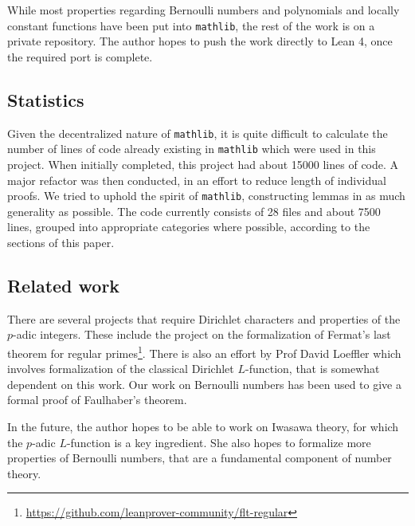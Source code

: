 \documentclass[a4paper,UKenglish,cleveref, autoref, thm-restate,pdfa]{lipics-v2021}
\newcommand{\lean}[1]{\texttt{#1}\xspace} %
\begin{document}
While most properties regarding Bernoulli numbers and polynomials and locally constant functions have been put into \lean{mathlib}, the rest of the work is on a private repository. The author hopes to push the 
work directly to Lean 4, once the required port is complete.

\subsection{Statistics}
Given the decentralized nature of \lean{mathlib}, it is quite difficult to calculate the number of lines of code 
already existing in \lean{mathlib} which were used in this project. When initially completed, this project had about 
15000 lines of code. A major refactor was then conducted, in an effort to reduce length of individual proofs. 
We tried to uphold the spirit of \lean{mathlib}, constructing lemmas in as much generality as possible. %
The code currently consists of 28 files and about 7500 lines, grouped into appropriate categories where possible, 
according to the sections of this paper.

\subsection{Related work} %
There are several projects that require Dirichlet characters and properties of the $p$-adic integers. 
These include the project on the formalization of Fermat's last theorem for regular primes\footnote{\url{https://github.com/leanprover-community/flt-regular}}. 
There is also an effort by Prof David Loeffler which involves formalization of the classical Dirichlet $L$-function, that is somewhat dependent on this work. 
Our work on Bernoulli numbers has been used to give a formal proof of Faulhaber's theorem.

In the future, the author hopes to be able to work on Iwasawa theory, for which the $p$-adic $L$-function is a key ingredient. She also hopes to formalize more properties of Bernoulli numbers, 
that are a fundamental component of number theory.


\end{document}
